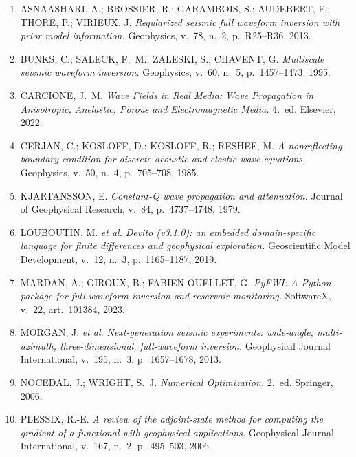 \documentclass[11pt,a4paper,oneside]{report}
\begin{document}
\begin{enumerate}[leftmargin=*,itemsep=3pt]
\item ASNAASHARI, A.; BROSSIER, R.; GARAMBOIS, S.; AUDEBERT, F.; THORE, P.;
VIRIEUX, J.
\emph{Regularized seismic full waveform inversion with prior model
information.} Geophysics, v.~78, n.~2, p.~R25--R36, 2013.

\item BUNKS, C.; SALECK, F.~M.; ZALESKI, S.; CHAVENT, G.
\emph{Multiscale seismic waveform inversion.} Geophysics, v.~60, n.~5,
p.~1457--1473, 1995.

\item CARCIONE, J.~M. \emph{Wave Fields in Real Media: Wave Propagation in
Anisotropic, Anelastic, Porous and Electromagnetic Media.} 4.~ed. Elsevier,
2022.

\item CERJAN, C.; KOSLOFF, D.; KOSLOFF, R.; RESHEF, M. \emph{A nonreflecting
boundary condition for discrete acoustic and elastic wave equations.}
Geophysics, v.~50, n.~4, p.~705--708, 1985.

\item KJARTANSSON, E. \emph{Constant-Q wave propagation and attenuation.}
Journal of Geophysical Research, v.~84, p.~4737--4748, 1979.

\item LOUBOUTIN, M. \emph{et al.} \emph{Devito (v3.1.0): an embedded
domain-specific language for finite differences and geophysical exploration.}
Geoscientific Model Development, v.~12, n.~3, p.~1165--1187, 2019.

\item MARDAN, A.; GIROUX, B.; FABIEN-OUELLET, G. \emph{PyFWI: A Python package
for full-waveform inversion and reservoir monitoring.} SoftwareX, v.~22,
art.~101384, 2023.

\item MORGAN, J. \emph{et al.} \emph{Next-generation seismic experiments:
wide-angle, multi-azimuth, three-dimensional, full-waveform inversion.}
Geophysical Journal International, v.~195, n.~3, p.~1657--1678, 2013.

\item NOCEDAL, J.; WRIGHT, S.~J. \emph{Numerical Optimization.} 2.~ed.
Springer, 2006.

\item PLESSIX, R.-E. \emph{A review of the adjoint-state method for computing
the gradient of a functional with geophysical applications.} Geophysical
Journal International, v.~167, n.~2, p.~495--503, 2006.


\end{enumerate}
\end{document}
